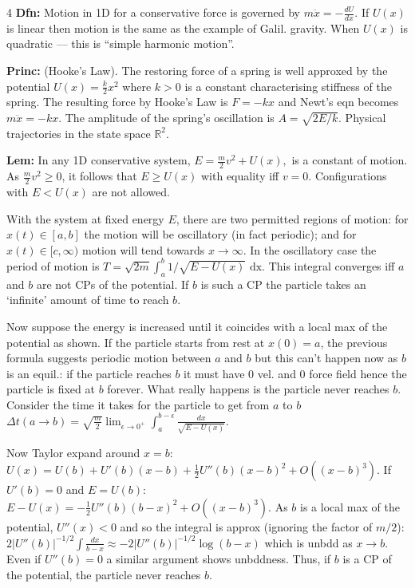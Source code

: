 \documentclass[landscape, 8pt]{extarticle}
\begin{document}
\begin{multicols*}{4}
		\textbf{Dfn:} Motion in 1D for a conservative force is governed by
		$
		m\ddot{x} = -\frac{dU}{dx}.
		$
		If $U(x)$ is linear then motion is the same as the example of Galil. gravity. When $U(x)$ is quadratic --- this is ``simple harmonic motion''.
		
		\textbf{Princ:} (Hooke's Law). The restoring force of a spring is well approxed by the potential
		$
		U(x)=\frac{k}{2}x^2
		$
		where $k>0$ is a constant characterising stiffness of the spring. The resulting force by Hooke's Law is $F=-kx$ and Newt's eqn becomes $m\ddot{x}=-kx$. The amplitude of the spring's oscillation is $A=\sqrt{2E/k}$. Physical trajectories in the state space $\mathbb{R}^2$.
		
		\textbf{Lem:} In any 1D conservative system,
		$
		E = \frac{m}{2}v^2+U(x),
		$
		is a constant of motion. As $\frac{m}{2}v^2\geq 0$, it follows that $E\geq U(x)$ with equality iff $v=0$. Configurations with $E<U(x)$ are not allowed.
		
		With the system at fixed energy $E$, there are two permitted regions of motion: for $x(t)\in[a,b]$ the motion will be oscillatory (in fact periodic); and for $x(t)\in[c,\infty)$ motion will tend towards $x\to\infty$. In the oscillatory case the period of motion is
		$
		T = \sqrt{2m}\int_a^b 1/\sqrt{E-U(x)} \text{ dx}.
		$
		This integral converges iff $a$ and $b$ are not CPs of the potential. If $b$ is such a CP the particle takes an `infinite' amount of time to reach $b$.
		
		Now suppose the energy is increased until it coincides with a local max of the potential as shown. If the particle starts from rest at $x(0)=a$, the previous formula suggests periodic motion between $a$ and $b$ but this can't happen now as $b$ is an equil.: if the particle reaches $b$ it must have $0$ vel. and $0$ force field hence the particle is fixed at $b$ forever. What really happens is the particle never reaches $b$. Consider the time it takes for the particle to get from $a$ to $b$
		$
		\Delta t(a\to b) = \sqrt{\frac{m}{2}}\lim_{\epsilon\to 0^+}\int_a^{b-\epsilon}\frac{dx}{\sqrt{E-U(x)}}.
		$
		
		Now Taylor expand around $x=b$:
		$
		U(x) = U(b)+U'(b)(x-b)+\tfrac{1}{2}U''(b)(x-b)^2+O((x-b)^3).
		$
		If $U'(b)=0$ and $E=U(b)$:
		$
		E-U(x) = -\tfrac{1}{2}U''(b)(b-x)^2+O((x-b)^3).
		$
		As $b$ is a local max of the potential, $U''(x)<0$ and so the integral is approx (ignoring the factor of $m/2$):
		$
		2|U''(b)|^{-1/2}\int\frac{dx}{b-x} \approx -2|U''(b)|^{-1/2}\log(b-x)
		$
		which is unbdd as $x\to b$. Even if $U''(b)=0$ a similar argument shows unbddness. Thus, if $b$ is a CP of the potential, the particle never reaches $b$.
		

\end{multicols*}
\end{document}

